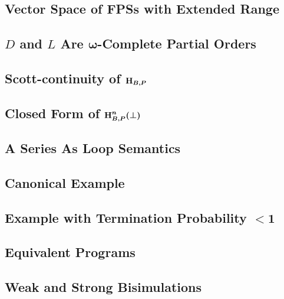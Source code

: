 \subsection{Vector Space of FPSs with Extended Range}
\label{proof:vector_space}


\subsection{$D$ and $L$ Are $\boldsymbol{\omega}$-Complete Partial Orders}
\label{proof:cpos}


\subsection{Scott-continuity of $\boldsymbol{\operatorname{H}_{B, P}}$}
\label{proof:scott_continuity}


\subsection{Closed Form of $\boldsymbol{\operatorname{H}_{B, P}^n(\bot)}$}
\label{proof:closed_form_of_hh}


\subsection{A Series As Loop Semantics}
\label{proof:series_for_while}


\subsection{Canonical Example}
\label{proof:canonical_example}


\subsection{Example with Termination Probability $\boldsymbol{< 1}$}
\label{proof:term_prob_lt_1}


\subsection{Equivalent Programs}
\label{proof:equivalent_programs}


\subsection{Weak and Strong Bisimulations}
\label{proof:bisimulations}
